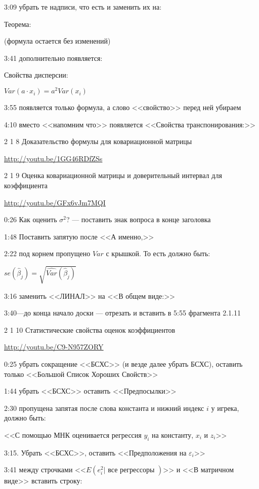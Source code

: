 \documentclass[12pt,a4paper]{article}
\begin{document}
3:09 убрать те надписи, что есть и заменить их на:

Теорема:

(формула остается без изменений)

3:41 дополнительно появляется:

Свойства дисперсии:

$Var(a\cdot x_i)=a^2 Var(x_i)$

3:55 появляется только формула, а слово <<свойство>> перед ней убираем

4:10 вместо <<напомним что>> появляется <<Свойства транспонирования:>>





2 1 8 Доказательство формулы для ковариационной матрицы

\url{http://youtu.be/1GG46RDfZSs}

2 1 9 Оценка ковариационной матрицы и доверительный интервал для коэффициента

\url{http://youtu.be/GFx6vJm7MQI}

0:26 Как оценить $\sigma^2$? --- поставить знак вопроса в конце заголовка

1:48 Поставить запятую после <<А именно,>>

2:22 под корнем пропущено $Var$ с крышкой. То есть должно быть:

$se(\hat{\beta}_j)=\sqrt{\widehat{Var}(\hat{\beta}_j)}$

3:16 заменить <<ЛИНАЛ>> на <<В общем виде:>>

3:40---до конца начало доски  --- отрезать и вставить в 5:55 фрагмента 2.1.11


2 1 10 Статистические свойства оценок коэффициентов

\url{http://youtu.be/C9-N957ZORY}

0:25 убрать сокращение <<БСХС>> (и везде далее убрать БСХС), оставить только <<Большой Список Хороших Свойств>> 


1:44 убрать <<БСХС>> оставить <<Предпосылки>>

2:30 пропущена запятая после слова константа и нижний индекс $i$ у игрека, должно быть:

<<С помощью МНК оценивается регрессия $y_i$ на константу, $x_i$ и $z_i$>>


3:15. Убрать <<БСХС>>, оставить <<Предположения на $\varepsilon_i$>>

3:41 между строчками <<$E(e_i^2 | \text{ все регрессоры })$>> и <<В матричном виде>> вставить строку:
\end{document}

